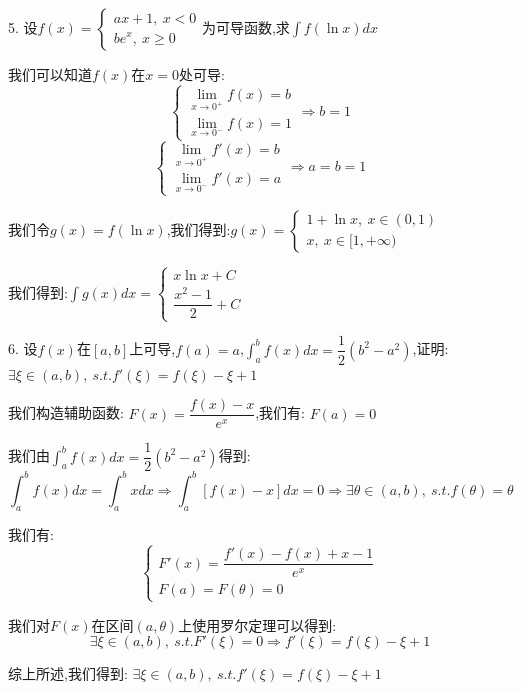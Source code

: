 5. 设$f(x)=\left\lbrace
\begin{array}{l}
	ax+1,\ x<0\\
	be^x,\ x\geq 0
\end{array}
\right. $为可导函数,求$\int f(\ln x)dx$
\begin{solution}

	我们可以知道$f(x)$在$x=0$处可导:
	$$\left\lbrace
	\begin{array}{l}
		\lim\limits_{x\rightarrow 0^{+}}f(x)=b\\
		\lim\limits_{x\rightarrow 0^{-}}f(x)=1
	\end{array}
	\right. \Rightarrow b=1$$
	$$\left\lbrace
	\begin{array}{l}
		\lim\limits_{x\rightarrow 0^{+}}f'(x)=b\\
		\lim\limits_{x\rightarrow 0^{-}}f'(x)=a
	\end{array}
	\right.\Rightarrow a=b=1$$
	
	我们令$g(x)=f(\ln x)$,我们得到:$g(x)=\left\lbrace
	\begin{array}{l}
		1+\ln x,\ x\in(0,1)\\
		x,\ x\in[1,+\infty)
	\end{array}
	\right. $
	
	我们得到:$\int g(x)dx=\left\lbrace
	\begin{array}{l}
		x\ln x+C\\
		\dfrac{x^2-1}{2}+C
	\end{array}
	\right. $
\end{solution}

6. 设$f(x)$在$[a,b]$上可导,$f(a)=a$,$\int_{a}^{b}f(x)dx=\dfrac{1}{2}(b^2-a^2)$,证明:$\exists\xi\in(a,b),\ s.t. f'(\xi)=f(\xi)-\xi+1$
\begin{solution}

	我们构造辅助函数:  $F(x)=\dfrac{f(x)-x}{e^x}$,我们有:  $F(a)=0$
	
	我们由$\int_{a}^{b}f(x)dx=\dfrac{1}{2}(b^2-a^2)$得到:  
	$$\int_{a}^{b}f(x)dx=\int_{a}^{b}xdx\Rightarrow \int_{a}^{b}\left[ f(x)-x\right] dx=0\Rightarrow \exists \theta\in(a,b),\ s.t. f(\theta)=\theta$$
	
	我们有:  
	$$\left\lbrace
	\begin{array}{l}
		F'(x)=\dfrac{f'(x)-f(x)+x-1}{e^x}\\
		F(a)=F(\theta)=0
	\end{array}
	\right. $$
	
	我们对$F(x)$在区间$(a,\theta)$上使用罗尔定理可以得到:  
	$$\exists\xi\in(a,b),\ s.t. F'(\xi)=0\Rightarrow f'(\xi)=f(\xi)-\xi+1$$
	
	综上所述,我们得到:  $\exists\xi\in(a,b),\ s.t. f'(\xi)=f(\xi)-\xi+1$
\end{solution}


